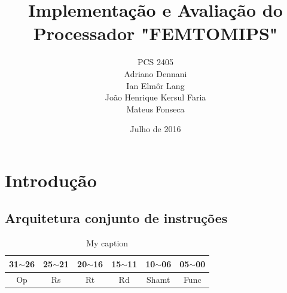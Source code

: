 \documentclass[11pt,a4paper]{article}
\begin{document}
\title{Implementação e Avaliação do Processador "FEMTOMIPS"}
\author{PCS 2405 \\ Adriano Dennani \\ Ian Elmôr Lang \\ João Henrique Kersul Faria \\ Mateus Fonseca}
\date{Julho de 2016}
\maketitle
\tableofcontents

\graphicspath{ {diagramas/} }

\section{Introdução}

\subsection{Arquitetura conjunto de instruções}

\begin{table}[]
\centering
\caption{My caption}
\label{my-label}
\begin{tabular}{|l|l|l|l|l|l|}
\hline
\textbf{31$\sim$26}      & \textbf{25$\sim$21}     & \textbf{20$\sim$16}     & \textbf{15$\sim$11}     & \textbf{10$\sim$06}        & \textbf{05$\sim$00}       \\ \hline
\multicolumn{1}{|c|}{Op} & \multicolumn{1}{c|}{Rs} & \multicolumn{1}{c|}{Rt} & \multicolumn{1}{c|}{Rd} & \multicolumn{1}{c|}{Shamt} & \multicolumn{1}{c|}{Func} \\ \hline
\end{tabular}
\end{table}
\end{document}

